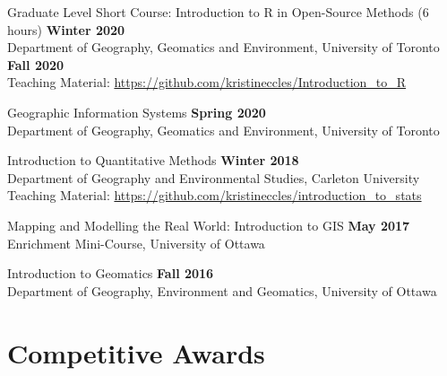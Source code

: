 \documentclass[margin,line]{res}
\begin{document}
\begin{resume}
Graduate Level Short Course: Introduction to R in Open-Source Methods (6 hours) \hfill {\textbf{Winter 2020}}\\
Department of Geography, Geomatics and Environment, University of Toronto \hfill {\textbf{Fall 2020}}
\\Teaching Material: \url{https://github.com/kristineccles/Introduction_to_R}

Geographic Information Systems \hfill {\textbf{Spring 2020}}\\
Department of Geography, Geomatics and Environment, University of Toronto

Introduction to Quantitative Methods
 \hfill {\textbf{Winter 2018}}\\
Department of Geography and Environmental Studies, Carleton University\\
Teaching Material: \url{https://github.com/kristineccles/introduction_to_stats}

Mapping and Modelling the Real World: Introduction to GIS \hfill {\textbf{May 2017}}\\
Enrichment Mini-Course, University of Ottawa

Introduction to Geomatics
\hfill {\textbf{Fall 2016}}\\
Department of Geography, Environment and Geomatics, University of Ottawa

\vspace*{.1in}

\section{\sc Competitive Awards}


\end{resume}
\end{document}
